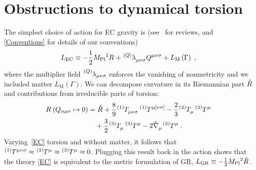 \documentclass[aps,prd,reprint,preprintnumbers,showpacs,floatfix,nofootinbib,superscript address,longbibliography]{revtex4-1}
\begin{document}
\section{Obstructions to dynamical torsion}
The simplest choice of action for EC gravity is (see~\cite{Hehl:1976kj, Shapiro:2001rz, Blagojevic:2002, Blagojevic:2012bc} for reviews, and \cref{Conventions} for details of our conventions)
\begin{equation} \label{EC}
	L_{\text{EC}}  \equiv -\frac{1}{2} \Planck^2 \rcR{} 	+ \TLambda[Q]{_{\mu\nu\sigma}}Q{^{\mu\nu\sigma}}+L_{\text{M}}\left(\Gamma\right) \;,
\end{equation}
where the multiplier field $\TLambda[Q]{_{\mu\nu\sigma}}$ enforces the vanishing of nonmetricity and we included matter $L_{\text{M}}\left(\Gamma\right)$. We can decompose curvature in its Riemannian part $\rR{}$ and contributions from irreducible parts of torsion:
	\begin{align}
		\rcR{}\left(Q_{\alpha\mu\nu}\mapsto 0\right) & = \rR{}
		+
		\frac{8}{9}
		\T[1]{_{\mu\nu\sigma}}
		\T[1]{^{\mu[\nu\sigma]}}
		-
		\frac{2}{3}
		\T[2]{_{\mu}}
		\T[2]{^{\mu}}	
		\nonumber\\
		&\ \ \ 
		+
		\frac{3}{2}
		\T[3]{_{\mu}}
		\T[3]{^{\mu}}	
		-
		2\rD{_\mu}\T[2]{^\mu} \;.
\label{decomposition}
	\end{align}
Varying~\cref{EC} \wrt torsion and without matter, it follows that $\T[1]{^{\mu\nu\sigma}}\approx\T[2]{^{\mu}}\approx\T[3]{^{\mu}}\approx 0$. Plugging this result back in the action shows that the theory \eqref{EC} is equivalent to the metric formulation of GR, $L_{\text{GR}} \equiv -\frac{1}{2} \Planck^2 \rR{}$. 
\end{document}
